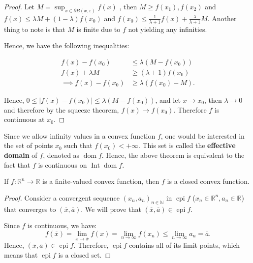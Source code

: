\begin{proof}
  Let \( M = \sup_{x \in \partial B(x, \varepsilon)} f(x) \) , then \( M \ge
  f(x_{1}), f(x_{2}) \) and \( f(x) \le  \lambda M + (1-\lambda)f(x_{0}) \) and
  \( f(x_{0}) \le \frac{1}{\lambda+1} f(x) + \frac{\lambda}{\lambda+1} M \).
  Another thing to note is that \( M \) is finite due to \( f \) not yielding
  any infinities.

  Hence, we have the following inequalities:

  \begin{align*}
    f(x) - f(x_{0}) &\le  \lambda(M - f(x_{0}))\\
    f(x) + \lambda M &\ge (\lambda + 1) f(x_{0})\\
    \implies f(x) - f(x_{0}) &\ge  \lambda (f(x_{0}) - M)
  .\end{align*}

  Hence, \( 0 \le  |f(x) - f(x_{0})| \le  \lambda (M-f(x_{0})) \), and let \( x \to
  x_{0} \), then \( \lambda \to  0 \) and therefore by the squeeze theorem, \(
  f(x) \to  f(x_{0}) \). Therefore \( f \) is continuous at \( x_{0} \).
\end{proof}

Since we allow infinity values in a convex function \( f \), one would be interested in
the set of points \( x_{0} \) such that \( f(x_{0}) < +\infty \). This set is
called the \textbf{effective domain} of \( f \), denoted as \(
\operatorname{dom} f \). Hence, the above theorem is equivalent to the fact that
\( f \) is continuous on \( \operatorname{Int} \operatorname{dom} f \).

\begin{corollary}
\label{cor:Finite-valued convex functions are closed}
  If \( f: \mathbb{R}^{n} \to  \mathbb{R}  \) is a finite-valued convex function,
  then \( f \) is a closed convex function.
\end{corollary}

\begin{proof}
  Consider a convergent sequence \( (x_{n}, a_{n})_{n \in \mathbb{N}} \) in \(
  \operatorname{epi}  f\) (\( x_{n} \in \mathbb{R}^{n}, a_{n} \in \mathbb{R} \))
  that converges to \( (\overline{x}, \overline{a}) \). We will prove that \(
  (\overline{x}, \overline{a}) \in \operatorname{epi} f \).

  Since \( f \) is continuous, we have:
  \[
    f(\overline{x}) = \lim_{x \to \overline{x}} f(x) = \lim_{n \to \infty}
    f(x_{n}) \le  \lim_{n \to \infty} a_{n} = \overline{a}
  .\] 
  Hence, \( (\overline{x}, \overline{a}) \in \operatorname{epi} f \). Therefore,
  \( \operatorname{epi} f \) contains all of its limit points, which means that
  \( \operatorname{epi} f \) is a closed set.
\end{proof}

